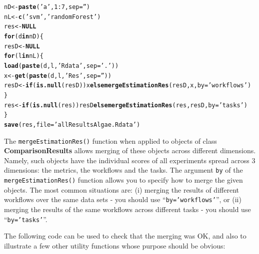 \documentclass[10pt,a4paper]{article}\usepackage[]{graphicx}\usepackage[]{color}
\makeatletter
\newcommand{\hlnum}[1]{\textcolor[rgb]{0.686,0.059,0.569}{#1}}%
\newcommand{\hlstr}[1]{\textcolor[rgb]{0.192,0.494,0.8}{#1}}%
\newcommand{\hlopt}[1]{\textcolor[rgb]{0,0,0}{#1}}%
\newcommand{\hlstd}[1]{\textcolor[rgb]{0.345,0.345,0.345}{#1}}%
\newcommand{\hlkwa}[1]{\textcolor[rgb]{0.161,0.373,0.58}{\textbf{#1}}}%
\newcommand{\hlkwb}[1]{\textcolor[rgb]{0.69,0.353,0.396}{#1}}%
\newcommand{\hlkwc}[1]{\textcolor[rgb]{0.333,0.667,0.333}{#1}}%
\newcommand{\hlkwd}[1]{\textcolor[rgb]{0.737,0.353,0.396}{\textbf{#1}}}%
\newenvironment{kframe}{%
 \def\at@end@of@kframe{}%
 \ifinner\ifhmode%
  \def\at@end@of@kframe{\end{minipage}}%
  \begin{minipage}{\columnwidth}%
 \fi\fi%
 \def\FrameCommand##1{\hskip\@totalleftmargin \hskip-\fboxsep
 \colorbox{shadecolor}{##1}\hskip-\fboxsep
     \hskip-\linewidth \hskip-\@totalleftmargin \hskip\columnwidth}%
 \MakeFramed {\advance\hsize-\width
   \@totalleftmargin\z@ \linewidth\hsize
   \@setminipage}}%
 {\par\unskip\endMakeFramed%
 \at@end@of@kframe}
\newenvironment{knitrout}{}{} %
\makeatother
\begin{document}
\begin{knitrout}\footnotesize
{}\color{fgcolor}\begin{kframe}
\begin{alltt}
\hlstd{nD} \hlkwb{<-} \hlkwd{paste}\hlstd{(}\hlstr{'a'}\hlstd{,}\hlnum{1}\hlopt{:}\hlnum{7}\hlstd{,}\hlkwc{sep}\hlstd{=}\hlstr{''}\hlstd{)}
\hlstd{nL} \hlkwb{<-} \hlkwd{c}\hlstd{(}\hlstr{'svm'}\hlstd{,}\hlstr{'randomForest'}\hlstd{)}
\hlstd{res} \hlkwb{<-} \hlkwa{NULL}
\hlkwa{for}\hlstd{(d} \hlkwa{in} \hlstd{nD) \{}
  \hlstd{resD} \hlkwb{<-} \hlkwa{NULL}
  \hlkwa{for}\hlstd{(l} \hlkwa{in} \hlstd{nL) \{}
    \hlkwd{load}\hlstd{(}\hlkwd{paste}\hlstd{(d,l,}\hlstr{'Rdata'}\hlstd{,}\hlkwc{sep}\hlstd{=}\hlstr{'.'}\hlstd{))}
    \hlstd{x} \hlkwb{<-} \hlkwd{get}\hlstd{(}\hlkwd{paste}\hlstd{(d,l,}\hlstr{'Res'}\hlstd{,}\hlkwc{sep}\hlstd{=}\hlstr{''}\hlstd{))}
    \hlstd{resD} \hlkwb{<-} \hlkwa{if} \hlstd{(}\hlkwd{is.null}\hlstd{(resD)) x} \hlkwa{else} \hlkwd{mergeEstimationRes}\hlstd{(resD,x,}\hlkwc{by}\hlstd{=}\hlstr{'workflows'}\hlstd{)}
  \hlstd{\}}
  \hlstd{res} \hlkwb{<-} \hlkwa{if} \hlstd{(}\hlkwd{is.null}\hlstd{(res)) resD} \hlkwa{else} \hlkwd{mergeEstimationRes}\hlstd{(res,resD,}\hlkwc{by}\hlstd{=}\hlstr{'tasks'}\hlstd{)}
\hlstd{\}}
\hlkwd{save}\hlstd{(res,}\hlkwc{file}\hlstd{=}\hlstr{'allResultsAlgae.Rdata'}\hlstd{)}
\end{alltt}
\end{kframe}
\end{knitrout}

The \texttt{mergeEstimationRes()}  function when applied to objects of class
\textbf{ComparisonResults} allows merging of these objects across different
dimensions. Namely, such objects have the individual scores of all
experiments spread across 3 dimensions:  the
metrics, the workflows and the tasks. The argument
\texttt{by} of the \texttt{mergeEstimationRes()} function allows you to specify how
to merge the given objects. The most common situations are: (i)
merging the results of different workflows over the same data sets -
you should use ``\texttt{by='workflows'}'', or (ii) merging the results
of the same workflows across different tasks - you should use
``\texttt{by='tasks'}''.

The following code can be used to check that the merging was OK, and
also to illustrate a few other utility functions whose purpose should
be obvious:
\end{document}
